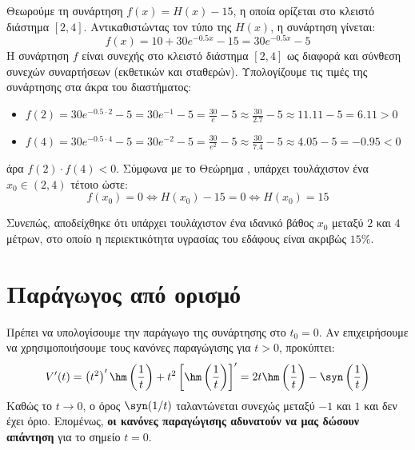 \lysh
Θεωρούμε τη συνάρτηση $f(x) = H(x) - 15$, η οποία ορίζεται στο κλειστό διάστημα $[2, 4]$. Αντικαθιστώντας τον τύπο της $H(x)$, η συνάρτηση γίνεται:
\[ f(x) = 10 + 30e^{-0.5x} - 15 = 30e^{-0.5x} - 5 \]
Η συνάρτηση $f$ είναι συνεχής στο κλειστό διάστημα $[2, 4]$ ως διαφορά και σύνθεση συνεχών συναρτήσεων (εκθετικών και σταθερών).
    Υπολογίζουμε τις τιμές της συνάρτησης στα άκρα του διαστήματος:
    \begin{itemize}
        \item $ f(2) = 30e^{-0.5 \cdot 2} - 5 = 30e^{-1} - 5 = \frac{30}{e} - 5 \approx \frac{30}{2.7} - 5 \approx 11.11 - 5 = 6.11 > 0 $
        \item $ f(4) = 30e^{-0.5 \cdot 4} - 5 = 30e^{-2} - 5 = \frac{30}{e^2} - 5 \approx \frac{30}{7.4} - 5 \approx 4.05 - 5 = -0.95 < 0 $
    \end{itemize}

άρα $f(2) \cdot f(4) < 0 $. Σύμφωνα με το Θεώρημα , υπάρχει τουλάχιστον ένα $x_0 \in (2, 4)$ τέτοιο ώστε:
\[ f(x_0) = 0 \Leftrightarrow H(x_0) - 15 = 0 \Leftrightarrow H(x_0) = 15 \]

Συνεπώς, αποδείχθηκε ότι υπάρχει τουλάχιστον ένα ιδανικό βάθος $x_0$ μεταξύ $2$ και $4$ μέτρων, στο οποίο η περιεκτικότητα υγρασίας του εδάφους είναι ακριβώς $15\%$.
\section{Παράγωγος από ορισμό}

\lysh
Πρέπει να υπολογίσουμε την παράγωγο της συνάρτησης στο $t_0 = 0$. Αν επιχειρήσουμε να χρησιμοποιήσουμε τους κανόνες παραγώγισης για $t > 0$, προκύπτει:
\[ V'(t) = \left( t^2 \right)' \hm\left(\frac{1}{t}\right) + t^2 \left[ \hm\left(\frac{1}{t}\right) \right]' = 2t \hm\left(\frac{1}{t}\right) - \syn\left(\frac{1}{t}\right) \]
Καθώς το $t \to 0$, ο όρος $\syn(1/t)$ ταλαντώνεται συνεχώς μεταξύ $-1$ και $1$ και δεν έχει όριο. Επομένως, \textbf{οι κανόνες παραγώγισης αδυνατούν να μας δώσουν απάντηση} για το σημείο $t=0$.

